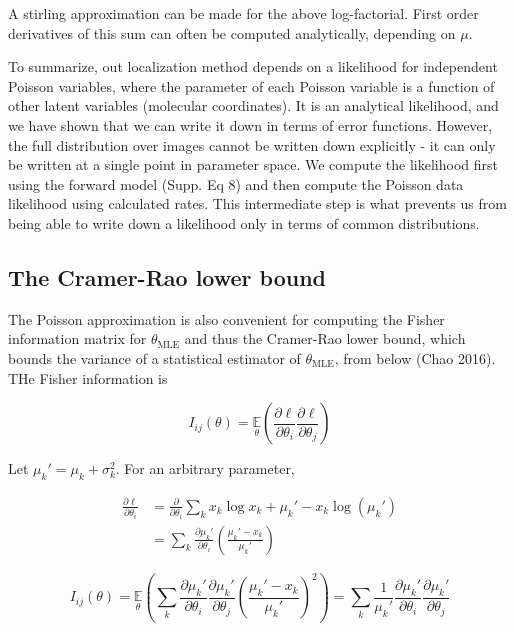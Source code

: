 \documentclass{ucetd}
\begin{document}
A stirling approximation can be made for the above log-factorial. First order derivatives of this sum can often be computed analytically, depending on $\mu$. 

To summarize, out localization method depends on a likelihood for independent Poisson variables, where the parameter of each Poisson variable is a function of other latent variables (molecular coordinates). It is an analytical likelihood, and we have shown that we can write it down in terms of error functions. However, the full distribution over images cannot be written down explicitly - it can only be written at a single point in parameter space. We compute the likelihood first using the forward model (Supp. Eq 8) and then compute the Poisson data likelihood using calculated rates. This intermediate step is what prevents us from being able to write down a likelihood only in terms of common distributions.

\subsection{The Cramer-Rao lower bound}

The Poisson approximation is also convenient for computing the Fisher information matrix for $\theta_{\mathrm{MLE}}$ and thus the Cramer-Rao lower bound, which bounds the variance of a statistical estimator of $\theta_{\mathrm{MLE}}$, from below (Chao 2016). THe Fisher information is

\begin{equation}
I_{ij}(\theta) = \underset{\theta}{\mathbb{E}}\left(\frac{\partial \ell}{\partial\theta_{i}}\frac{\partial\ell}{\partial\theta_{j}}\right) 
\end{equation}

Let $\mu_{k}' = \mu_{k} + \sigma_{k}^{2}$. For an arbitrary parameter,

\begin{align*}
\frac{\partial \ell}{\partial \theta_{i}} &= \frac{\partial}{\partial \theta_{i}} \sum_{k}  x_{k}\log x_{k} + \mu_{k}' - x_{k}\log\left(\mu_{k}'\right)\\
&= \sum_{k} \frac{\partial \mu_{k}'}{\partial\theta_{i}} \left(\frac{\mu_{k}'-x_{k}}{\mu_{k}'}\right)
\end{align*}

\begin{equation*}
I_{ij}(\theta) = \underset{\theta}{\mathbb{E}}\left(\sum_{k}\frac{\partial \mu_{k}'}{\partial\theta_{i}}\frac{\partial \mu_{k}'}{\partial\theta_{j}} \left(\frac{\mu_{k}'-x_{k}}{\mu_{k}'}\right)^{2}\right) = \sum_{k}\frac{1}{\mu_{k}'}\frac{\partial \mu_{k}'}{\partial\theta_{i}}\frac{\partial \mu_{k}'}{\partial\theta_{j}}
\end{equation*}
\end{document}
